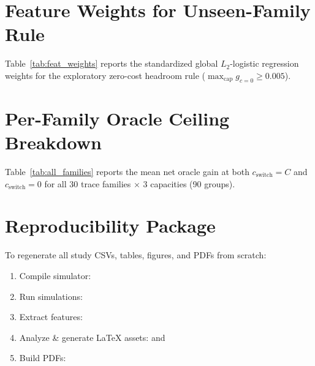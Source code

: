 \documentclass[10pt,twocolumn]{article}
\begin{document}
\section{Feature Weights for Unseen-Family Rule}
\label{sec:weights}
Table~\ref{tab:feat_weights} reports the standardized global $L_2$-logistic regression weights for the exploratory zero-cost headroom rule ($\max_{\text{cap}} g_{c=0} \ge 0.005$).

\begin{table}[h]
\centering
\footnotesize
\caption{Standardized Logistic Weights (Exploratory H3)}
\label{tab:feat_weights}

\end{table}

\section{Per-Family Oracle Ceiling Breakdown}
\label{sec:families}
Table~\ref{tab:all_families} reports the mean net oracle gain at both $c_{\text{switch}}=C$ and $c_{\text{switch}}=0$ for all 30 trace families $\times$ 3 capacities (90 groups).

\onecolumn
\begin{center}
\scriptsize
\renewcommand{\arraystretch}{0.85}
\label{tab:all_families}

\end{center}
\twocolumn

\section{Reproducibility Package}
To regenerate all study CSVs, tables, figures, and PDFs from scratch:
\begin{enumerate}
\item Compile simulator: 
\item Run simulations: 
\item Extract features: 
\item Analyze \& generate LaTeX assets:  and 
\item Build PDFs: 
\end{enumerate}
\end{document}
